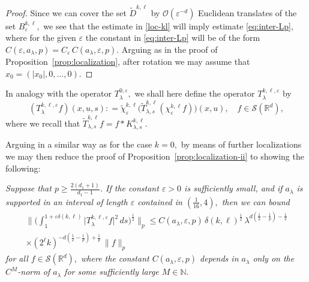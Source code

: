 \documentclass[leqno]{amsart}
\theoremstyle{definition}
\theoremstyle{remark}
\numberwithin{equation}{section}
\newcommand{\R}{\mathbb{R}}
\newcommand{\N}{\mathbb{N}}
\newcommand{\eps}{\varepsilon}
\newcommand\la{{\lambda}}
\newcommand\ve{{\varepsilon}}
\begin{document}
\begin{proof}
Since we can cover the set $\tilde D^{k,\ell}$ by $\mathcal O(\eps^{-d})$ Euclidean translates of the set $B^{k,\ell}_\ve,$ we see that the estimate in \eqref{loc-kl} will imply estimate \eqref{eq:inter-Lp}, where for the given $\ve $ the constant in \eqref{eq:inter-Lp} will be of the form $C(\ve,a_\la,p) =C_\ve\, C(a_\la,\ve,p)$. Arguing as in the proof of Proposition~\ref{prop:localization}, after rotation we may assume that $x_0=(|x_0|,0,\dots,0)$.
\end{proof} 

In analogy with the  operator $T^{0,\ve}_\la,$ we shall here define the operator $T^{k,\ell,\ve}_{\la}$ by
\begin{equation}\label{Tkle}
(T^{k,\ell,\ve}_{\la} f)(x,u,s) : = \tilde \chi^{k,\ell}_\ve \big(\tilde T^{k,\ell}_{\la,s}( \chi^{k,\ell}_\ve f)\big)(x,u),\quad f\in \mathcal S(\R^d),
\end{equation}
where we recall that $\tilde T^{k,\ell}_{\la,s} f = f*K_{\lambda,s}^{k,\ell}$.

\smallskip

Arguing in a similar way as for the case $k=0,$  by means of  further localizations we may then reduce the proof of Proposition~\ref{prop:localization-ii} to showing the following:

\medskip

{\it 
Suppose that   $p\ge \frac{2(d_1+1)}{d_1-1}$.
If the constant $\ve>0$ is  sufficiently small, and if $a_\la$ is supported in an interval of length $\ve$ contained in 
$(\frac 1{16},4),$ then we can bound 
\begin{multline}\label{eq:Tkllambdas}
\Big\| \Big( \int_1^{1+\ve\delta(k,\ell)} \big| T^{k,\ell,\ve}_{\la} f \big|^2 \, ds \Big)^{\frac{1}{2}} \Big\|_p
\le C(a_\lambda,\eps,p)\, \delta(k,\ell)^{\frac 12}\,\lambda^{d(\frac 12 - \frac 1p )-\frac 12} \\
\times (2^\ell k)^{-d(\frac 12 - \frac 1p ) + \frac1p }\,\|f\|_p 
\end{multline}
for all  $f\in \mathcal S(\R^d),$ where the constant  $C(a_\lambda,\eps,p)$ depends in $a_\la$ only on the $C^M$-norm of $a_\lambda$ for some sufficiently large $M\in\N.$}

\smallskip
\end{document}
